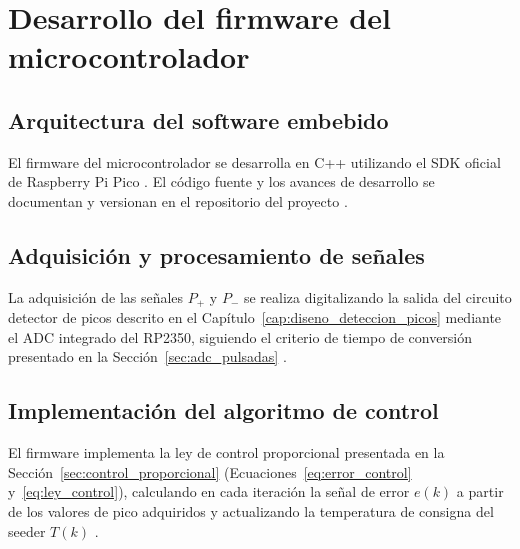 \chapter{Desarrollo del firmware del microcontrolador}
\label{cap:firmware}

\section{Arquitectura del software embebido}
\label{sec:arquitectura_firmware}

El firmware del microcontrolador se desarrolla en C++ utilizando el SDK
oficial de Raspberry Pi Pico \cite{sat2026,informeMarzo2026}. El c\'odigo
fuente y los avances de desarrollo se documentan y versionan en el
repositorio del proyecto \cite{kicad_hsrl}.


\section{Adquisici\'on y procesamiento de se\~nales}
\label{sec:adquisicion_procesamiento}

La adquisici\'on de las se\~nales $P_+$ y $P_-$ se realiza digitalizando
la salida del circuito detector de picos descrito en el
Cap\'itulo~\ref{cap:diseno_deteccion_picos} mediante el ADC integrado
del RP2350, siguiendo el criterio de tiempo de conversi\'on presentado
en la Secci\'on~\ref{sec:adc_pulsadas} \cite{informeEneFeb2026}.


\section{Implementaci\'on del algoritmo de control}
\label{sec:algoritmo_control}

El firmware implementa la ley de control proporcional presentada en la
Secci\'on~\ref{sec:control_proporcional} (Ecuaciones~\ref{eq:error_control}
y~\ref{eq:ley_control}), calculando en cada iteraci\'on la se\~nal de
error $e(k)$ a partir de los valores de pico adquiridos y actualizando
la temperatura de consigna del seeder $T(k)$ \cite{informeMarzo2026}.

